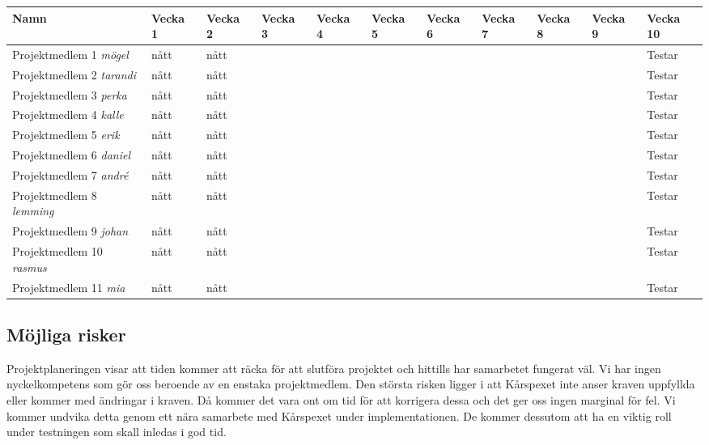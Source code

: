 \documentclass[a4paper, twoside, 11pt, titlepage]{article}
\begin{document}
	\begin {table} [ht] \begin{tabular} {  p{5cm} p{2cm} p{2cm} p{2cm} p{2cm} p{2cm} p{2cm} p{2cm} p{2cm} p{2cm} p{2cm} }
		\hline
		{ Namn } & { Vecka 1} & { Vecka 2} & { Vecka 3} & { Vecka 4} & { Vecka 5} & { Vecka 6} & { Vecka 7} & { Vecka 8} & { Vecka 9} & { Vecka 10 } \\
		\hline
		{ Projektmedlem 1 \emph{mögel} } & { nått } & { nått } & { } & {} & { } & {} & { } & {} & { } & { Testar } \\
		\hline
		{ Projektmedlem 2 \emph{tarandi}} & { nått } & { nått } & { } & {} & { } & {} & { } & {} & { } & { Testar } \\
		\hline
		{ Projektmedlem 3 \emph{perka}} & { nått } & { nått } & { } & {} & { } & {} & { } & {} & { } & { Testar } \\
		\hline
		{ Projektmedlem 4 \emph{kalle}} & { nått } & { nått } & { } & {} & { } & {} & { } & {} & { } & { Testar } \\
		\hline
		{ Projektmedlem 5 \emph{erik}} & { nått } & { nått } & { } & {} & { } & {} & { } & {} & { } & { Testar } \\
		\hline
		{ Projektmedlem 6 \emph{daniel}} & { nått } & { nått } & { } & {} & { } & {} & { } & {} & { } & { Testar } \\
		\hline
		{ Projektmedlem 7 \emph{andré}} & { nått } & { nått } & { } & {} & { } & {} & { } & {} & { } & { Testar } \\
		\hline
		{ Projektmedlem 8 \emph{lemming}} & { nått } & { nått } & { } & {} & { } & {} & { } & {} & { } & { Testar } \\
		\hline
		{ Projektmedlem 9 \emph{johan}} & { nått } & { nått } & { } & {} & { } & {} & { } & {} & { } & { Testar } \\
		\hline
		{ Projektmedlem 10 \emph{rasmus}} & { nått } & { nått } & { } & {} & { } & {} & { } & {} & { } & { Testar } \\
		\hline
		{ Projektmedlem 11 \emph{mia}} & { nått } & { nått } & { } & {} & { } & {} & { } & {} & { } & { Testar } \\
		\hline
	\end{tabular} \end{table} \FloatBarrier


	\subsection{Möjliga risker}


	Projektplaneringen visar att tiden kommer att räcka för att slutföra projektet och hittills har samarbetet fungerat väl. Vi har ingen nyckelkompetens som gör oss beroende av en enstaka projektmedlem. Den största risken ligger i att Kårspexet inte anser kraven uppfyllda eller kommer med ändringar i kraven. Då kommer det vara ont om tid för att korrigera dessa och det ger oss ingen marginal för fel. Vi kommer undvika detta genom ett nära samarbete med Kårspexet under implementationen. De kommer dessutom att ha en viktig roll under testningen som skall inledas i god tid.
\end{document}
